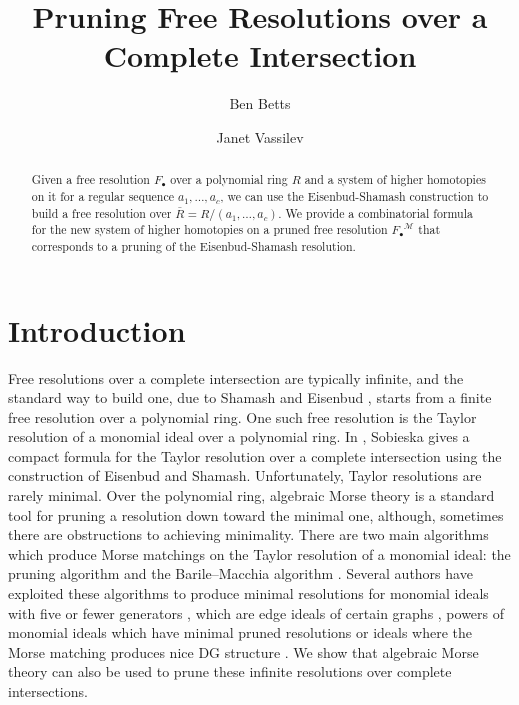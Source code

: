 \documentclass[12pt]{amsart}
\title[Pruning Free Resolutions over a Complete Intersection]{Pruning Free Resolutions over a Complete Intersection}
\author{Ben Betts}
\author{Janet Vassilev}
\date{}
\theoremstyle{plain}
\theoremstyle{definition}
\newcommand{\F}{ {F_\bullet} }
\newcommand{\M}{\mathcal{M}}
\begin{document}
\begin{abstract}
Given a free resolution $\F$ over a polynomial ring $R$ and a system of higher homotopies on it for a regular sequence $a_1,\dots,a_c$, we can use the Eisenbud-Shamash construction to build a free resolution over $\bar{R}=R/(a_1,\dots,a_c)$. We provide a combinatorial formula for the new system of higher homotopies on a pruned free resolution $\F^\M$ that corresponds to a pruning of the Eisenbud-Shamash resolution.
\end{abstract}

\maketitle

\section*{Introduction}

Free resolutions over a complete intersection are typically infinite, and the standard way to build one, due to Shamash \cite{Shamash} and Eisenbud \cite{Eisenbud1980}, starts from a finite free resolution over a polynomial ring. One such free resolution is the Taylor resolution \cite{Taylor} of a monomial ideal over a polynomial ring. In \cite{Sobieska}, Sobieska gives a compact formula for the Taylor resolution over a complete intersection using the construction of Eisenbud and Shamash.
Unfortunately, Taylor resolutions are rarely minimal. Over the polynomial ring, algebraic Morse theory is a standard tool for pruning a resolution down toward the minimal one, although, sometimes there are obstructions to achieving minimality. There are two main algorithms which produce Morse matchings on the Taylor resolution of a monomial ideal: the pruning algorithm \cite{AlvarezFernandezGimenez} and the Barile--Macchia algorithm \cite{BarileMacchia,ChauKara}.
Several authors have exploited these algorithms to produce minimal resolutions for monomial ideals with five or fewer generators \cite{Faridi4gen,Chau5gen}, which are edge ideals of certain graphs \cite{BarileMacchia,ChauKara,Chauetalpath,ChauHagenBarileMacchia}, powers of monomial ideals which have minimal pruned resolutions \cite{CooperetalMorseres,Cooperetalsimplicialres,ChauHaMinCellpowersofgraphs} or ideals where the Morse matching produces nice DG structure \cite{CameronChauMaitraTribone,GelleretalDGprune}.
We show that algebraic Morse theory can also be used to prune these infinite resolutions over complete intersections.
\end{document}
